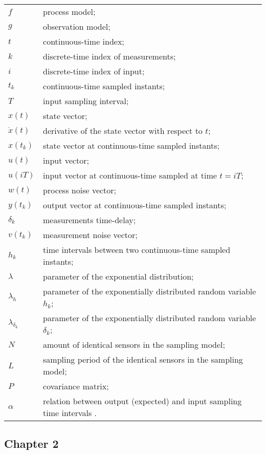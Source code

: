 \begin{longtable}{ll}
	$f$						& process model; \\
	$g$						& observation model; \\
	$t$						& continuous-time index; \\
	$k$						& discrete-time index of measurements; \\
	$i$						& discrete-time index of input; \\
	$t_k$					& continuous-time sampled instants; \\
	$T$						& input sampling interval; \\
	$x(t)$					& state vector; \\
	$\dot{x}(t)$			& derivative of the state vector with respect to $t$; \\
	$x(t_k)$				& state vector at continuous-time sampled instants; \\
	$u(t)$					& input vector; \\
	$u(iT)$					& input vector at continuous-time sampled at time $t = iT$; \\						
	$w(t)$					& process noise vector; \\
	$y(t_k)$            	& output vector at continuous-time sampled instants;\\
	$\delta_{k}$			& measurements time-delay; \\
	$v(t_k)$				& measurement noise vector; \\
	$h_k$					& time intervals between two continuous-time sampled instants; \\
	$\lambda$ 				& parameter of the exponential distribution; \\
	$\lambda_h$				& parameter of the exponentially distributed random variable $h_k$; \\
	$\lambda_{\delta_{k}}$	& parameter of the exponentially distributed random variable $\delta_{k}$; \\
	$N$						& amount of identical sensors in the sampling model; \\
	$L$						& sampling period of the identical sensors in the sampling model; \\
	$P$						& covariance matrix; \\
	$\alpha$				& relation between output (expected) and input sampling time intervals . \\
\end{longtable}

\subsection*{Chapter 2}

